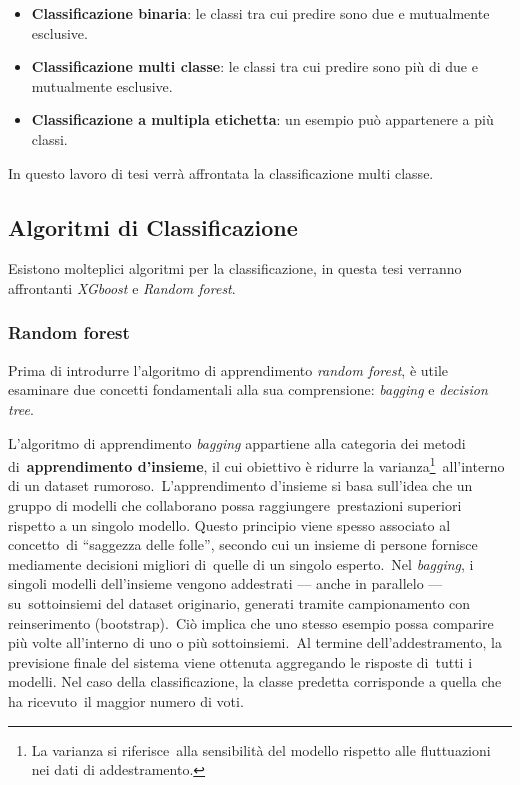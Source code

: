 \begin{itemize}
      \item \textbf{Classificazione binaria}: le classi tra cui predire sono due e mutualmente esclusive.
      \item \textbf{Classificazione multi classe}: le classi tra cui predire sono più di due e mutualmente esclusive.
      \item \textbf{Classificazione a multipla etichetta}: un esempio può appartenere a più classi.
\end{itemize}

In questo lavoro di tesi verrà affrontata la classificazione multi classe.

\subsection{Algoritmi di Classificazione}

Esistono molteplici algoritmi per la classificazione, in questa tesi verranno affrontanti \textit{XGboost} e \textit{Random forest}.

\subsubsection{Random forest}

Prima di introdurre l'algoritmo di apprendimento \textit{random forest}, è utile esaminare due concetti
fondamentali alla sua comprensione: \textit{bagging} e \textit{decision tree}.

L'algoritmo di apprendimento \textit{bagging} appartiene alla categoria dei metodi di\
\textbf{apprendimento d'insieme}, il cui obiettivo è ridurre la varianza\footnote{La varianza si riferisce\
      alla sensibilità del modello rispetto alle fluttuazioni nei dati di addestramento.}\
all'interno di un dataset rumoroso.\
L'apprendimento d'insieme si basa sull'idea che un gruppo di modelli che collaborano possa raggiungere\
prestazioni superiori rispetto a un singolo modello. Questo principio viene spesso associato al concetto\
di ``saggezza delle folle'', secondo cui un insieme di persone fornisce mediamente decisioni migliori di\
quelle di un singolo esperto.\
Nel \textit{bagging}, i singoli modelli dell'insieme vengono addestrati --- anche in parallelo --- su\
sottoinsiemi del dataset originario, generati tramite campionamento con reinserimento (bootstrap).\
Ciò implica che uno stesso esempio possa comparire più volte all'interno di uno o più sottoinsiemi.\
Al termine dell'addestramento, la previsione finale del sistema viene ottenuta aggregando le risposte di\
tutti i modelli. Nel caso della classificazione, la classe predetta corrisponde a quella che ha ricevuto\
il maggior numero di voti.

